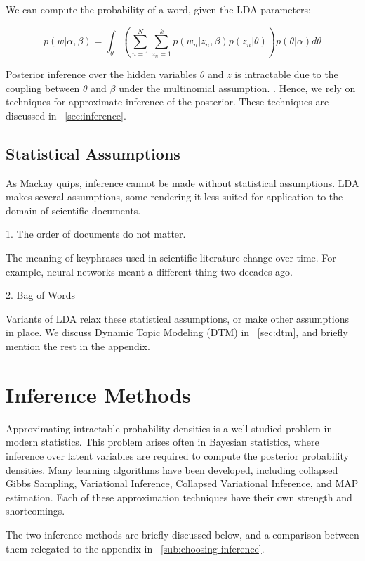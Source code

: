 \documentclass[letterpaper]{article}
\begin{document}
We can compute the probability of a word, given the LDA parameters:

\begin{equation}
  p(w | \alpha, \beta) = \int_\theta \left( \sum_{n=1}^{N}
    \sum_{z_n = 1}^{k} p(w_n | z_n, \beta)p(z_n | \theta) \right)
  p(\theta | \alpha) d\theta
\end{equation}

Posterior inference over the hidden variables $\theta$ and $z$ is
intractable due to the coupling between $\theta$ and $\beta$ under the
multinomial assumption. \citep{blei2003latent}. Hence, we rely on
techniques for approximate inference of the posterior. These
techniques are discussed in ~\autoref{sec:inference}.

\subsection{Statistical Assumptions}
\label{subsec:statistical-assumptions}
As Mackay quips, inference cannot be made without statistical
assumptions. LDA makes several assumptions, some rendering it less
suited for application to the domain of scientific documents.

1. The order of documents do not matter.

The meaning of keyphrases used in scientific literature change over
time. For example, neural networks meant a different thing two decades
ago.

2. Bag of Words

Variants of LDA relax these statistical assumptions, or make other
assumptions in place. We discuss Dynamic Topic Modeling (DTM) in
~\autoref{sec:dtm}, and briefly mention the rest in the appendix.

\section{Inference Methods}
\label{sec:inference}
Approximating intractable probability densities is a well-studied
problem in modern statistics. This problem arises often in Bayesian
statistics, where inference over latent variables are required to
compute the posterior probability densities. Many learning algorithms
have been developed, including collapsed Gibbs Sampling, Variational
Inference, Collapsed Variational Inference, and MAP estimation. Each
of these approximation techniques have their own strength and
shortcomings.

The two inference methods are briefly discussed below, and a
comparison between them relegated to the appendix in
~\autoref{sub:choosing-inference}.
\end{document}
